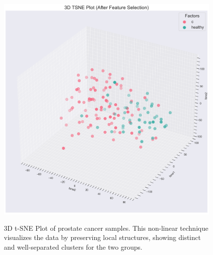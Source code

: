 \documentclass[journal]{IEEEtran}
\begin{document}
\begin{figure}[htbp]
 \centering
 \includegraphics[width=\linewidth]{prostate_cancer_figures/clustering/after_feature_selection/3D_tsne_plot.png}
\caption{3D t-SNE Plot of prostate cancer samples. This non-linear technique visualizes the data by preserving local structures, showing distinct and well-separated clusters for the two groups.}
\label{fig:prostate_tsne}
\end{figure}
\end{document}

